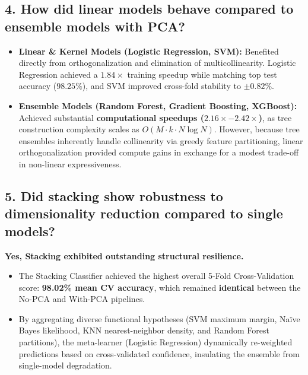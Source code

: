 \documentclass[12pt,a4paper]{article}
\begin{document}
\subsection{4. How did linear models behave compared to ensemble models with PCA?}
\begin{itemize}
\item \textbf{Linear \& Kernel Models (Logistic Regression, SVM):} Benefited directly from orthogonalization and elimination of multicollinearity. Logistic Regression achieved a $1.84\times$ training speedup while matching top test accuracy ($98.25\%$), and SVM improved cross-fold stability to $\pm 0.82\%$.
\item \textbf{Ensemble Models (Random Forest, Gradient Boosting, XGBoost):} Achieved substantial \textbf{computational speedups ($2.16\times - 2.42\times$)}, as tree construction complexity scales as $O(M \cdot k \cdot N \log N)$. However, because tree ensembles inherently handle collinearity via greedy feature partitioning, linear orthogonalization provided compute gains in exchange for a modest trade-off in non-linear expressiveness.
\end{itemize}

\subsection{5. Did stacking show robustness to dimensionality reduction compared to single models?}
\textbf{Yes, Stacking exhibited outstanding structural resilience.}
\begin{itemize}
\item The Stacking Classifier achieved the highest overall 5-Fold Cross-Validation score: \textbf{98.02\% mean CV accuracy}, which remained \textbf{identical} between the No-PCA and With-PCA pipelines.
\item By aggregating diverse functional hypotheses (SVM maximum margin, Naïve Bayes likelihood, KNN nearest-neighbor density, and Random Forest partitions), the meta-learner (Logistic Regression) dynamically re-weighted predictions based on cross-validated confidence, insulating the ensemble from single-model degradation.
\end{itemize}
\end{document}
